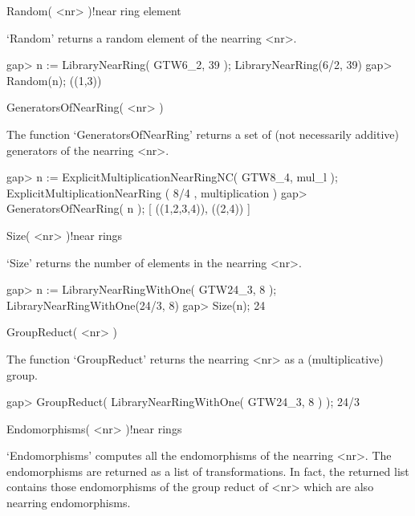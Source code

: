 

\>Random( <nr> )!{near ring element}

`Random' returns a random element of the nearring <nr>.

\beginexample
    gap> n := LibraryNearRing( GTW6_2, 39 );                    
    LibraryNearRing(6/2, 39)
    gap> Random(n);
    ((1,3))
\endexample



\>GeneratorsOfNearRing( <nr> )

The function `GeneratorsOfNearRing' returns a set of (not necessarily
additive) generators of the nearring <nr>.

\beginexample
    gap> n := ExplicitMultiplicationNearRingNC( GTW8_4, mul_l );
    ExplicitMultiplicationNearRing ( 8/4 , multiplication )
    gap> GeneratorsOfNearRing( n );
    [ ((1,2,3,4)), ((2,4)) ]
\endexample



\>Size( <nr> )!{near rings}

`Size' returns the number of elements in the nearring <nr>.

\beginexample
    gap> n := LibraryNearRingWithOne( GTW24_3, 8 );
    LibraryNearRingWithOne(24/3, 8)
    gap> Size(n);
    24
\endexample



\>GroupReduct( <nr> )

The function `GroupReduct' returns the nearring <nr> as a
(multiplicative) group.

\beginexample
    gap> GroupReduct( LibraryNearRingWithOne( GTW24_3, 8 ) );
    24/3
\endexample



\>Endomorphisms( <nr> )!{near rings}

`Endomorphisms' computes all the endomorphisms of the nearring <nr>. 
The endomorphisms are returned as a list of transformations. In fact, the
returned list contains those endomorphisms of the group reduct of <nr>
which are also nearring endomorphisms.


